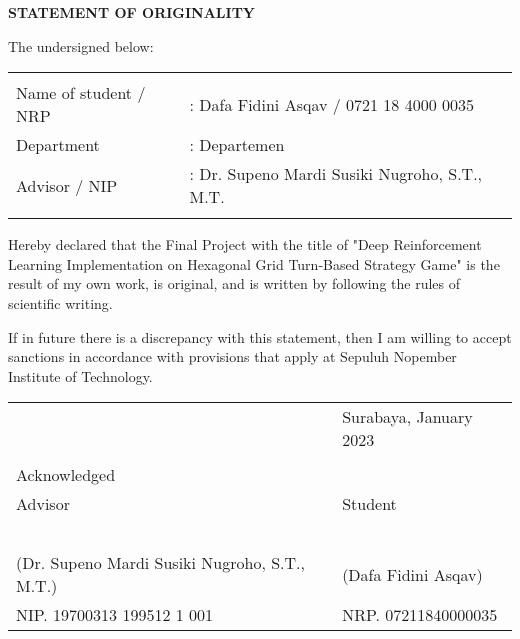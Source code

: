 \begin{center}
  \large
  \textbf{STATEMENT OF ORIGINALITY}
\end{center}

\thispagestyle{empty}

\vspace{2ex}


\noindent The undersigned below:

\noindent\begin{tabularx}{\textwidth}{X X l}
  & \\
  Name of student / NRP &: Dafa Fidini Asqav / 0721 18 4000 0035 \\
  Department &: Departemen \\
  Advisor / NIP &: Dr. Supeno Mardi Susiki Nugroho, S.T., M.T.  \\
  & \\
\end{tabularx}

Hereby declared that the Final Project with the title of "Deep Reinforcement Learning Implementation on Hexagonal Grid Turn-Based Strategy Game" is the result of my own work, is original, and is written by following the rules of scientific writing.

If in future there is a discrepancy with this statement, then I am willing to accept sanctions in accordance with provisions that apply at Sepuluh Nopember Institute of Technology.

\vspace{8ex}

\noindent\begin{tabularx}{\textwidth}{X l}
  & Surabaya, January 2023\\
  & \\
  Acknowledged & \\
  Advisor & Student\\
  & \\
  & \\
  & \\
  & \\
  & \\
  (Dr. Supeno Mardi Susiki Nugroho, S.T., M.T.) & (Dafa Fidini Asqav) \\
  NIP. 19700313 199512 1 001 & NRP. 07211840000035 \\
\end{tabularx}